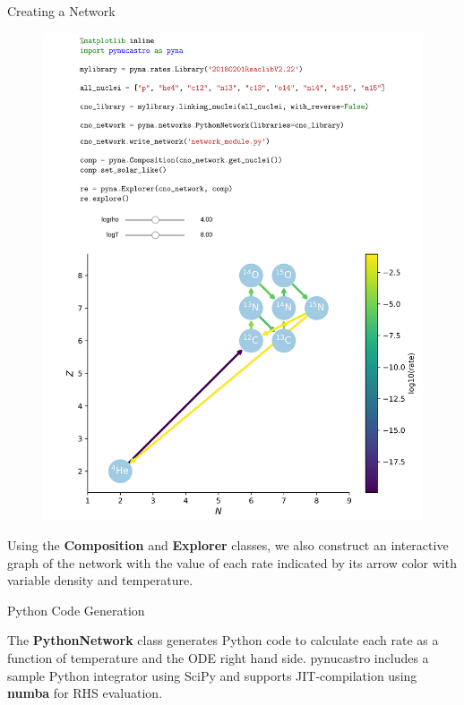 \documentclass[final]{beamer}
\newlength{\onecolwid}
\newlength{\twocolwid}
\newcommand{\isotm}[2]{{}^{#2}\mathrm{#1}}
\begin{document}
\begin{frame}[t]
\begin{columns}[t]
\begin{column}{\twocolwid}
\begin{columns}[t,totalwidth=\twocolwid]
\begin{column}{\onecolwid}
\begin{block}{Creating a Network}
\begin{figure}
\includegraphics[width=1.1\linewidth]{figures/library-examples-nuclei.png}
\end{figure}

Using the \textbf{Composition} and \textbf{Explorer} classes, we also
construct an interactive graph of the network with the value of each
rate indicated by its arrow color with variable density and temperature.

\end{block}


\begin{block}{Python Code Generation}

The \textbf{PythonNetwork} class generates Python code to calculate
each rate as a function of temperature and the ODE right hand
side. pynucastro includes a sample Python integrator using SciPy and supports JIT-compilation using \textbf{numba} for RHS evaluation.



\end{block}
\end{column}
\end{columns}
\end{column}
\end{columns}
\end{frame}
\end{document}
